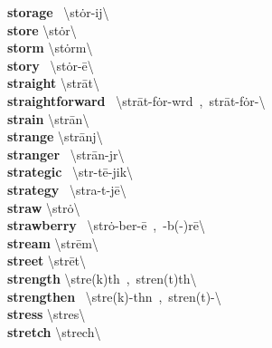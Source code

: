 \documentclass[10pt,a4paper]{article}
\begin{document}
\begin{multicols}{2}
\textbf{ storage }\quad \ \textbackslash \textprimstress st\.{o}r-ij\textbackslash \\
\textbf{ store }\quad \textbackslash \textprimstress st\.{o}r\textbackslash \\
\textbf{ storm }\quad \textbackslash \textprimstress st\.{o}rm\textbackslash \\
\textbf{ story }\quad \ \textbackslash \textprimstress st\.{o}r-\={e}\textbackslash \\
\textbf{ straight }\quad \textbackslash \textprimstress str\={a}t\textbackslash \\
\textbf{ straightforward }\quad \ \textbackslash \textsecstress str\={a}t-\textprimstress f\.{o}r-w\textschwa rd\ ,\ \textprimstress str\={a}t-\textsecstress f\.{o}r-\textbackslash \\
\textbf{ strain }\quad \textbackslash \textprimstress str\={a}n\textbackslash \\
\textbf{ strange }\quad \textbackslash \textprimstress str\={a}nj\textbackslash \\
\textbf{ stranger }\quad \ \textbackslash \textprimstress str\={a}n-j\textschwa r\textbackslash \\
\textbf{ strategic }\quad \ \textbackslash str\textschwa -\textprimstress t\={e}-jik\textbackslash \\
\textbf{ strategy }\quad \ \textbackslash \textprimstress stra-t\textschwa -j\={e}\textbackslash \\
\textbf{ straw }\quad \textbackslash \textprimstress str\.{o}\textbackslash \\
\textbf{ strawberry }\quad \ \textbackslash \textprimstress str\.{o}-\textsecstress ber-\={e}\ ,\ -b(\textschwa -)r\={e}\textbackslash \\
\textbf{ stream }\quad \textbackslash \textprimstress str\={e}m\textbackslash \\
\textbf{ street }\quad \textbackslash \textprimstress str\={e}t\textbackslash \\
\textbf{ strength }\quad \textbackslash \textprimstress stre\engma (k)th\ ,\ \textprimstress stren(t)th\textbackslash \\
\textbf{ strengthen }\quad \ \textbackslash \textprimstress stre\engma (k)-th\textschwa n\ ,\ \textprimstress stren(t)-\textbackslash \\
\textbf{ stress }\quad \textbackslash \textprimstress stres\textbackslash \\
\textbf{ stretch }\quad \textbackslash \textprimstress strech\textbackslash \\

\end{multicols}
\end{document}

